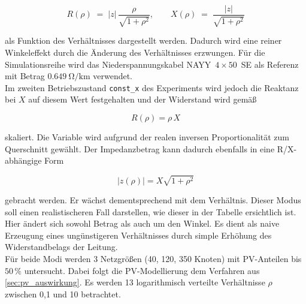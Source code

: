\begin{equation}
	R(\rho) \;=\; \lvert z\rvert\,\frac{\rho}{\sqrt{1+\rho^{2}}},
	\qquad
	X(\rho) \;=\; \frac{\lvert z\rvert}{\sqrt{1+\rho^{2}}}
	\label{eq:mode-constz}
\end{equation}

als Funktion des Verhältnisses dargestellt werden.
Dadurch wird eine reiner Winkeleffekt durch die Änderung des Verhältnisses erzwungen.
Für die Simulationsreihe wird das Niederspannungskabel NAYY~$4\times50$~SE als Referenz mit Betrag $\qty{0.649}{\ohm\per\kilo\metre}$ verwendet.\\

Im zweiten Betriebszustand \texttt{const\_x} des Experiments wird jedoch die Reaktanz bei $X$ auf diesem Wert festgehalten und  der Widerstand wird gemäß 

\begin{equation}
	R(\rho)=\rho\,X
	\label{eq:const_x}
\end{equation}

skaliert. 
Die Variable wird aufgrund der realen inversen Proportionalität zum Querschnitt gewählt.
Der Impedanzbetrag kann dadurch ebenfalls in eine R/X-abhängige Form 

\begin{equation}
\lvert z(\rho)\rvert = X\sqrt{1+\rho^{2}}
\label{eq:zrho}
\end{equation}

gebracht werden.
Er wächst dementsprechend mit dem Verhältnis.
Dieser Modus soll einen realistischeren Fall darstellen, wie dieser in der Tabelle ersichtlich ist.
Hier ändert sich sowohl Betrag als auch um den Winkel.
Es dient als naive Erzeugung eines ungünstigeren Verhältnisses durch simple Erhöhung des Widerstandbelags der Leitung.\\

Für beide Modi werden 3 Netzgrößen (40, 120, 350 Knoten) mit PV-Anteilen bis $50\,\%$ untersucht. 
Dabei folgt die PV-Modellierung  dem Verfahren aus \cref{sec:pv_auswirkung}.
Es werden 13 logarithmisch verteilte Verhältnisse $\rho$ zwischen 0,1 und 10 betrachtet.









